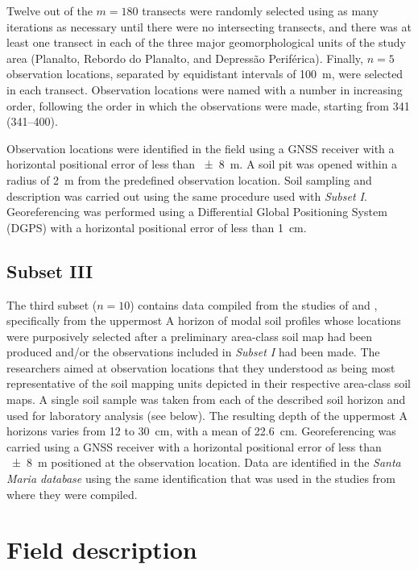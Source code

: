 Twelve out of the $m = 180$ transects were randomly selected using as many iterations as necessary until 
there were no intersecting transects, and there was at least one transect in each of the three major 
geomorphological units of the study area (Planalto, Rebordo do Planalto, and Depressão Periférica). 
Finally, $n = 5$ observation locations, separated by equidistant intervals of \SI{100}{\metre}, were 
selected in each transect. Observation locations were named with a number in increasing order, 
following the order in which the observations were made, starting from \num{341} (\num{341}--\num{400}).

Observation locations were identified in the field using a GNSS receiver with a horizontal positional error
of less than \SI{\pm8}{\metre}. A soil pit was opened within a radius of \SI{2}{\metre} from the predefined 
observation location. Soil sampling and description was carried out using the same procedure used with 
\emph{Subset I}. Georeferencing was performed using a Differential Global Positioning System (DGPS) with 
a horizontal positional error of less than \SI{1}{\centi\metre}.

\tocless\subsection{Subset III}

The third subset ($n = 10$) contains data compiled from the studies of  and
, specifically from the uppermost A horizon of modal soil profiles whose locations 
were purposively selected after a preliminary area-class soil map had been produced and/or the observations
included in \emph{Subset I} had been made. The researchers aimed at observation locations that they 
understood as being most representative of the soil mapping units depicted in their respective area-class 
soil maps. A single soil sample was taken from each of the described soil horizon and used for laboratory 
analysis (see below). The resulting depth of the uppermost A horizons varies from \num{12} to 
\SI{30}{\centi\metre}, with a mean of \SI{22.6}{\centi\metre}. Georeferencing was carried using a GNSS 
receiver with a horizontal positional error of less than \SI{\pm8}{\metre} positioned at the observation 
location. Data are identified in the \emph{Santa Maria database} using the same identification that was 
used in the studies from where they were compiled.

\tocless\section{Field description}


